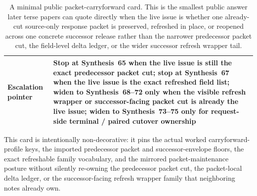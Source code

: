 \documentclass[11pt]{article}
\begin{document}
\begin{table}[t]
\begin{tabularx}{\linewidth}{@{}l X@{}}
Escalation pointer & Stop at Synthesis~65 when the live issue is still the exact predecessor packet cut; stop at Synthesis~67 when the live issue is the exact refreshed field list; widen to Synthesis~68--72 only when the visible refresh wrapper or successor-facing packet cut is already the live issue; widen to Synthesis~73--75 only for request-side terminal / paired cutover ownership \\
\bottomrule
\end{tabularx}
\caption{A minimal public packet-carryforward card. This is the smallest public answer later terse papers can quote directly when the live issue is whether one already-cut source-only response packet is preserved, refreshed in place, or reopened across one concrete successor release rather than the narrower predecessor packet cut, the field-level delta ledger, or the wider successor refresh wrapper tail.}
\label{tab:minimal-public-packet-carryforward-card}
\end{table}

This card is intentionally non-decorative: it pins the actual worked carryforward-profile keys, the imported predecessor packet and successor-envelope floors, the exact refreshable family vocabulary, and the mirrored packet-maintenance posture without silently re-owning the predecessor packet cut, the packet-local delta ledger, or the successor-facing refresh wrapper family that neighboring notes already own.\cite{series:workedexample}
\end{document}
